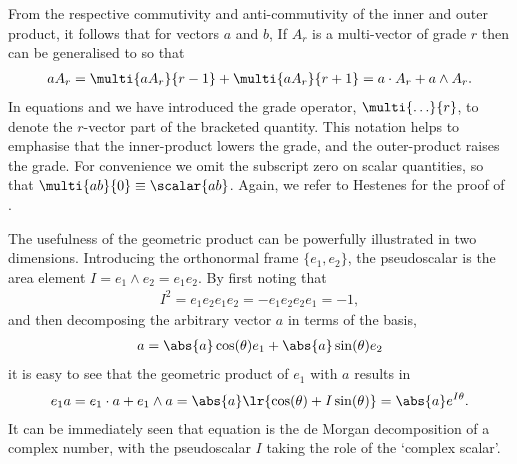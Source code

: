 From the respective commutivity and anti-commutivity of the inner and outer product,
it follows that for vectors $a$ and $b$, 
If $A_r$ is a multi-vector of grade $r$ then 
can be generalised to
so that
\begin{align}
a A_r =  \multi{a A_r}{r-1} + \multi{a A_r}{r+1} = a \cdot A_r + a\wedge A_r.
\label{eqn:gp_vect_multi}
\end{align}
In equations  and 
we have introduced the grade operator, $\multi{\ldots}{r}$, to denote the $r$-vector part of the bracketed quantity.  
This notation helps to emphasise that the inner-product  lowers the grade, 
and the outer-product raises the grade.
For convenience we omit the subscript zero on scalar quantities,
so that $\multi{ab}{0} \equiv \scalar{ab}$.
Again, we refer to Hestenes\cite{Hestenes1984} for the proof of .

The usefulness of the geometric product can be powerfully illustrated in two dimensions.
Introducing the orthonormal frame $\{e_1,e_2\}$,
the pseudoscalar is the area element $I= e_1\wedge e_2 = e_1 e_2$.
By first noting that 
\begin{align}
I^2 = e_1e_2e_1e_2 = -e_1e_2e_2e_1 = -1,
\end{align}
and then decomposing the arbitrary vector $a$ in terms of the basis,
\begin{align}
 a  = \abs{a}\cos(\theta)e_1 + \abs{a}\sin(\theta)e_2
\end{align}
it is easy to see that the geometric product of $e_1$  with  $a$ results in
\begin{align}
   e_1a  =  e_1\cdot a + e_1\wedge a = \abs{a}\lr{\cos(\theta) + I \sin(\theta)} =  \abs{a} e^{I\theta}.
\label{eqn:deMorgan}
\end{align}
It can be immediately seen that equation  is the de Morgan decomposition of a complex number,
with the pseudoscalar $I$ taking the role of the `complex scalar'.

